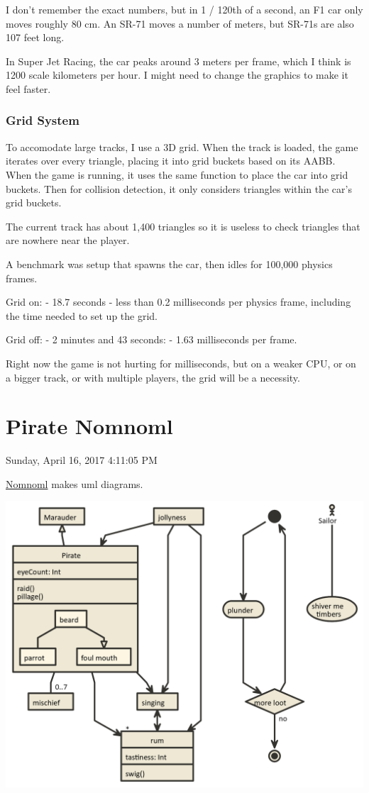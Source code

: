\documentclass[]{book}
\begin{document}
I don't remember the exact numbers, but in 1 / 120th of a second, an F1
car only moves roughly 80 cm. An SR-71 moves a number of meters, but
SR-71s are also 107 feet long.

In Super Jet Racing, the car peaks around 3 meters per frame, which I
think is 1200 scale kilometers per hour. I might need to change the
graphics to make it feel faster.

\subsection{Grid System}\label{grid-system}

To accomodate large tracks, I use a 3D grid. When the track is loaded,
the game iterates over every triangle, placing it into grid buckets
based on its AABB. When the game is running, it uses the same function
to place the car into grid buckets. Then for collision detection, it
only considers triangles within the car's grid buckets.

The current track has about 1,400 triangles so it is useless to check
triangles that are nowhere near the player.

A benchmark was setup that spawns the car, then idles for 100,000
physics frames.

Grid on: - 18.7 seconds - less than 0.2 milliseconds per physics frame,
including the time needed to set up the grid.

Grid off: - 2 minutes and 43 seconds: - 1.63 milliseconds per frame.

Right now the game is not hurting for milliseconds, but on a weaker CPU,
or on a bigger track, or with multiple players, the grid will be a
necessity.

\chapter{Pirate Nomnoml}\label{pirate-nomnoml}

 Sunday, April 16, 2017 4:11:05 PM

\href{http://nomnoml.com}{Nomnoml} makes uml diagrams.

\includegraphics{Image/Pirate.nomnoml.png}
\end{document}

